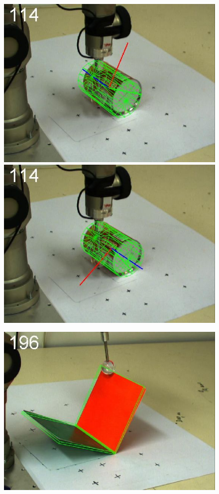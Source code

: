 \begin{figure}[htbp]
{\includegraphics[width=\imgAXwid]{images/A3_LWPR1_39_2}
\includegraphics[width=\imgAXwid]{images/A3_physx_39_2}
}
\centerline{
\includegraphics[width=\imgAXwid]{images/A1_2exp_667_3}
}
\end{figure}
